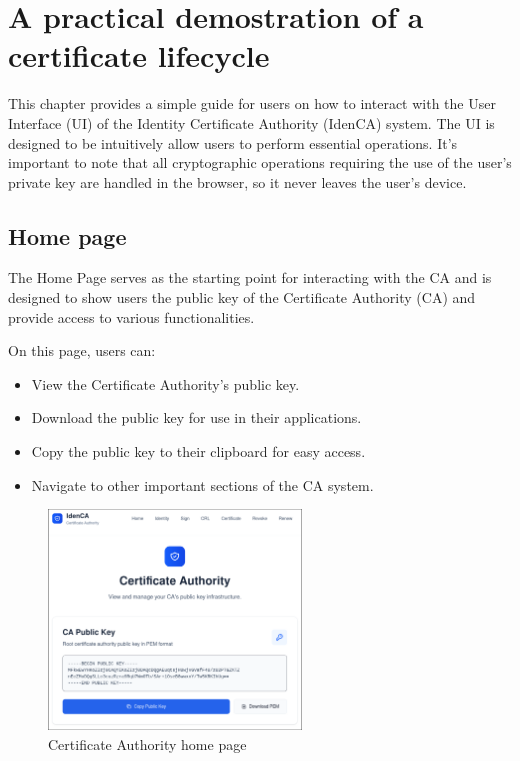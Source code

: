 \chapter{A practical demostration of a certificate lifecycle}

This chapter provides a simple guide for users on how to interact with the User Interface (UI) 
of the Identity Certificate Authority (IdenCA) system. The UI is designed to be intuitively 
allow users to perform essential operations. It's important to note that all cryptographic operations
requiring the use of the user's private key are handled in the browser, so it never leaves the 
user's device.

\section{Home page}
The Home Page serves as the starting point for interacting with the CA and is designed to show 
users the public key of the Certificate Authority (CA) and provide access to various functionalities.

On this page, users can:
\begin{itemize}
    \item View the Certificate Authority's public key.
    \item Download the public key for use in their applications.
    \item Copy the public key to their clipboard for easy access.
    \item Navigate to other important sections of the CA system.
\end{itemize}
\begin{figure}[h!]
    \centering
    \includegraphics[keepaspectratio, width=0.6\textwidth]{Pic/1_ca_pub_key.png}
    \caption{Certificate Authority home page}
    \label{fig:homepage}
\end{figure}

